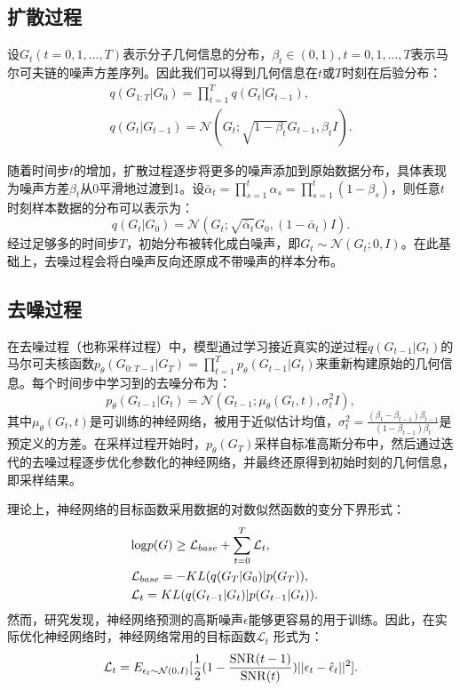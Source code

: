 \subsection{扩散过程}
设$G_t (t=0, 1, ..., T)$表示分子几何信息的分布，$\beta_t \in (0, 1), t=0, 1, ..., T$表示马尔可夫链的噪声方差序列。因此我们可以得到几何信息在$t$或$T$时刻在后验分布：
\begin{eqnarray}
&q(G_{1:T} | G_0) = \prod^T_{t=1} q(G_t | G_{t-1}), & \\
&q(G_t | G_{t-1}) = \mathcal{N}(G_t; \sqrt{1-\beta_t}G_{t-1}, \beta_t I).&
\end{eqnarray}

随着时间步$t$的增加，扩散过程逐步将更多的噪声添加到原始数据分布，具体表现为噪声方差$\beta_t$从0平滑地过渡到1。设$\bar{\alpha}_t = \prod^t_{s=1} \alpha_s = \prod^t_{s=1}(1-\beta_s)$，则任意$t$时刻样本数据的分布可以表示为：
\begin{equation}
    q(G_t|G_0) = \mathcal{N}(G_t; \sqrt{\bar{\alpha}_t} G_0, (1 - \bar{\alpha}_t) I).
\end{equation} 
经过足够多的时间步$T$，初始分布被转化成白噪声，即$G_t \sim \mathcal{N}(G_t; 0, I)$。在此基础上，去噪过程会将白噪声反向还原成不带噪声的样本分布。

\subsection{去噪过程}
在去噪过程（也称采样过程）中，模型通过学习接近真实的逆过程$q(G_{t-1} | G_t)$的马尔可夫核函数$p_\theta(G_{0:T-1}| G_{T}) = \prod^T_{t=1} p_\theta(G_{t-1} | G_t)$来重新构建原始的几何信息。每个时间步中学习到的去噪分布为： 
\begin{equation}
  p_\theta(G_{t-1} | G_t) = \mathcal{N}(G_{t-1}; \mu_\theta(G_t, t), \sigma_t^2 I),
\end{equation}
其中$\mu_\theta(G_t, t)$是可训练的神经网络，被用于近似估计均值，$\sigma^2_t = \frac{(\beta_t - \beta_{t-1})\beta_{t-1}}{(1 - \beta_{t-1}) \beta_t}$是预定义的方差。在采样过程开始时，$p_\theta(G_T)$采样自标准高斯分布中，然后通过迭代的去噪过程逐步优化参数化的神经网络，并最终还原得到初始时刻的几何信息，即采样结果。

理论上，神经网络的目标函数采用数据的对数似然函数的变分下界形式：
\begin{eqnarray}
    &{\rm log}p(G) \geq \mathcal{L}_{base} + \sum_{t=0}^T \mathcal{L}_t,& \\
    &\mathcal{L}_{base} = -KL(q(G_T|G_0)|p(G_T)),& \\
    &\mathcal{L}_t = KL(q(G_{t-1}|G_t)|p(G_{t-1}|G_t)). &
\end{eqnarray}
然而，研究发现，神经网络预测的高斯噪声$\epsilon$能够更容易的用于训练。因此，在实际优化神经网络时，神经网络常用的目标函数$\mathcal{L}_t$ \cite{vaediff_kingma_21}形式为：
\begin{equation}
    \mathcal{L}_t = E_{\epsilon_t \sim \mathcal{N}(0, I)}[\frac{1}{2}(1- \frac{{\rm SNR}(t-1)}{{\rm SNR}(t)})||\epsilon_t - \hat{\epsilon}_t||^2].
\end{equation}

